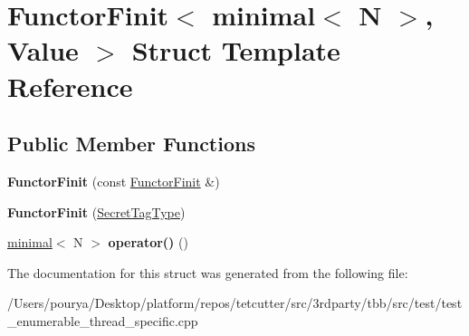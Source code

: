 \hypertarget{structFunctorFinit_3_01minimal_3_01N_01_4_00_01Value_01_4}{}\section{Functor\+Finit$<$ minimal$<$ N $>$, Value $>$ Struct Template Reference}
\label{structFunctorFinit_3_01minimal_3_01N_01_4_00_01Value_01_4}
\subsection*{Public Member Functions}
\begin{DoxyCompactItemize}
\item 
\hypertarget{structFunctorFinit_3_01minimal_3_01N_01_4_00_01Value_01_4_a1c02be3f7a7b34c0904e13cbbd3f5b97}{}{\bfseries Functor\+Finit} (const \hyperlink{structFunctorFinit}{Functor\+Finit} \&)\label{structFunctorFinit_3_01minimal_3_01N_01_4_00_01Value_01_4_a1c02be3f7a7b34c0904e13cbbd3f5b97}

\item 
\hypertarget{structFunctorFinit_3_01minimal_3_01N_01_4_00_01Value_01_4_a2445dfda3017a28671a54c1020b37b69}{}{\bfseries Functor\+Finit} (\hyperlink{structSecretTagType}{Secret\+Tag\+Type})\label{structFunctorFinit_3_01minimal_3_01N_01_4_00_01Value_01_4_a2445dfda3017a28671a54c1020b37b69}

\item 
\hypertarget{structFunctorFinit_3_01minimal_3_01N_01_4_00_01Value_01_4_a6f0cd2ae559235cd1574851985c72724}{}\hyperlink{classminimal}{minimal}$<$ N $>$ {\bfseries operator()} ()\label{structFunctorFinit_3_01minimal_3_01N_01_4_00_01Value_01_4_a6f0cd2ae559235cd1574851985c72724}

\end{DoxyCompactItemize}


The documentation for this struct was generated from the following file\+:\begin{DoxyCompactItemize}
\item 
/\+Users/pourya/\+Desktop/platform/repos/tetcutter/src/3rdparty/tbb/src/test/test\+\_\+enumerable\+\_\+thread\+\_\+specific.\+cpp\end{DoxyCompactItemize}
